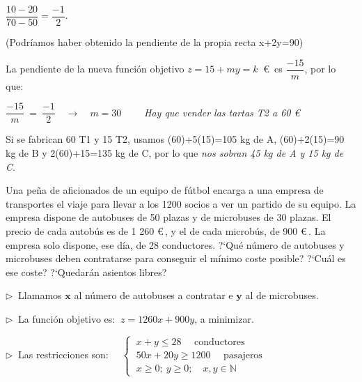 \vspace{3mm} $\dfrac{10-20}{70-50}=\dfrac{-1}{2}$. $\quad$\begin{small}\textcolor{gris}{(Podríamos haber obtenido la pendiente de la propia recta x+2y=90)}\end{small}

\vspace{3mm} La pendiente de la nueva función objetivo $z=15+my=k \ $ \euro  $ \,$ es  $\dfrac{-15}{m}$, por lo que:

\vspace{3mm} $\dfrac{-15}{m} \ = \ \dfrac {-1}{2} \quad \longrightarrow \quad m=30 \qquad$
\emph{Hay que vender las tartas T2 a 60 \euro $\,$}

\vspace{5mm}Si se fabrican 60 T1 y 15 T2, usamos (60)+5(15)=105 kg de A, (60)+2(15)=90 kg de B y 2(60)+15=135 kg de C, por lo que \emph{nos sobran 45 kg de A y 15 kg de C}.


\vspace{10mm}
\begin{ejemplo}
\begin{ejer}
	 Una peña de aficionados de un equipo de fútbol encarga a una empresa de transportes el viaje para llevar a los 1200 socios a ver un partido de su equipo. La empresa dispone de autobuses de 50 plazas y de microbuses de 30 plazas. El precio de cada autobús es de 1 260 \euro$\,$, y el de cada microbús, de 900 \euro$\,$. La empresa solo dispone, ese día, de 28 conductores. ?`Qué número de autobuses y microbuses deben contratarse para conseguir el mínimo coste posible? ?`Cuál es ese coste? ?`Quedarán asientos libres?
\end{ejer}	
\end{ejemplo}
\vspace{5mm}

$\triangleright \ $ Llamamos $\boldsymbol x$ al número de autobuses a contratar e $\boldsymbol y$ al de microbuses.

\vspace{3mm} $\triangleright \ $ La función objetivo es: $\ z= 1260x+900y$, a minimizar.

\vspace{3mm} $\triangleright \ $ Las restricciones son:
$\quad \begin{cases} \ x+y \boldsymbol{\le} 28 \quad \text{ conductores} \\ \ 50x+20y \boldsymbol{\ge} 1200 \quad \text{  pasajeros} \\ \ x\ge 0; \ y\ge 0; \quad x,y \in \mathbb N \end{cases}$

